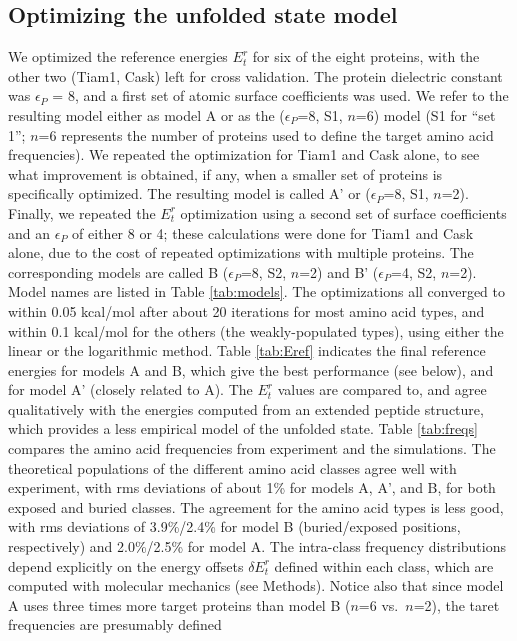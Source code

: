 \documentclass[12pt]{article}
\begin{document}
\subsection{Optimizing the unfolded state model}
We optimized the reference energies $E^r_t$ for six of the eight proteins, with the other two (Tiam1, Cask) left for cross
validation. The protein dielectric constant was $\epsilon_P$ = 8, and a first set of atomic surface coefficients was used.
We refer to the resulting model either as model A or as the ($\epsilon_P$=8, S1, $n$=6) model (S1 for ``set 1''; $n$=6
represents the number of proteins used to define the target amino acid frequencies). We repeated the optimization for Tiam1
and Cask alone, to see what improvement is obtained, if any, when a smaller set of proteins is specifically optimized.
The resulting model is called A' or ($\epsilon_P$=8, S1, $n$=2). Finally, we repeated the $E^r_t$ optimization using a
second set of surface coefficients and an $\epsilon_P$ of either 8 or 4; these calculations were done for Tiam1 and Cask
alone, due to the cost of repeated optimizations with multiple proteins. The corresponding models are called B ($\epsilon_P$=8,
S2, $n$=2) and B' ($\epsilon_P$=4, S2, $n$=2). Model names are listed in Table \ref{tab:models}. The optimizations all
converged to within 0.05 kcal/mol after about 20 iterations for most amino acid types, and within 0.1 kcal/mol for the
others (the weakly-populated types), using either the linear or the logarithmic method. Table \ref{tab:Eref} indicates
the final reference energies for models A and B, which give the best performance (see below), and for model A' (closely
related to A). The $E^r_t$ values are compared to, and agree qualitatively with the energies computed from an extended
peptide structure, which provides a less empirical model of the unfolded state. Table \ref{tab:freqs} compares the amino
acid frequencies from experiment and the simulations. The theoretical populations of the different amino acid classes agree
well with experiment, with rms deviations of about 1\% for models A, A', and B, for both exposed and buried classes. The
agreement for the amino acid types is less good, with rms deviations of 3.9\%/2.4\% for model B (buried/exposed positions,
respectively) and 2.0\%/2.5\% for model A. The intra-class frequency distributions depend explicitly on the energy offsets
$\delta E^r_t$ defined within each class, which are computed with molecular mechanics (see Methods). Notice also that since
model A uses three times more target proteins than model B ($n$=6 vs.\ $n$=2), the taret frequencies are presumably defined
\end{document}
